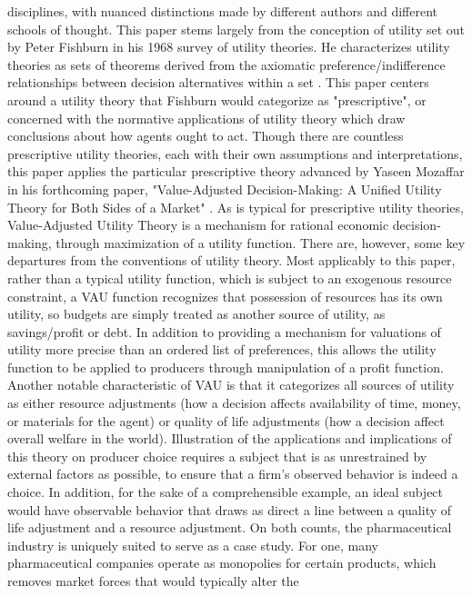 \documentclass[12pt,english]{article} \usepackage{mathptmx}
\begin{document}
disciplines, with nuanced distinctions made by different authors and 
different schools of thought. This paper stems largely from the 
conception of utility set out by Peter Fishburn in his 1968 survey of 
utility theories. He characterizes utility theories as sets of theorems 
derived from the axiomatic preference/indifference relationships between 
decision alternatives within a set \cite{fishburn68}. This paper centers 
around a utility theory that Fishburn would categorize as 
"prescriptive", or concerned with the normative applications of utility 
theory which draw conclusions about how agents ought to act. Though 
there are countless prescriptive utility theories, each with their own 
assumptions and interpretations, this paper applies the particular 
prescriptive theory advanced by Yaseen Mozaffar in his forthcoming 
paper, "Value-Adjusted Decision-Making: A Unified Utility Theory for 
Both Sides of a Market" \cite{mozaffar20}. As is typical for 
prescriptive utility theories, Value-Adjusted Utility Theory is a 
mechanism for rational economic decision-making, through maximization of 
a utility function. There are, however, some key departures from the 
conventions of utility theory. Most applicably to this paper, rather 
than a typical utility function, which is subject to an exogenous 
resource constraint, a VAU function recognizes that possession of 
resources has its own utility, so budgets are simply treated as another 
source of utility, as savings/profit or debt. In addition to providing a 
mechanism for valuations of utility more precise than an ordered list of 
preferences, this allows the utility function to be applied to producers 
through manipulation of a profit function. Another notable 
characteristic of VAU is that it categorizes all sources of utility as 
either resource adjustments (how a decision affects availability of 
time, money, or materials for the agent) or quality of life adjustments 
(how a decision affect overall welfare in the world). Illustration of 
the applications and implications of this theory on producer choice 
requires a subject that is as unrestrained by external factors as 
possible, to ensure that a firm's observed behavior is indeed a choice. 
In addition, for the sake of a comprehensible example, an ideal subject 
would have observable behavior that draws as direct a line between a 
quality of life adjustment and a resource adjustment. On both counts, 
the pharmaceutical industry is uniquely suited to serve as a case study. 
For one, many pharmaceutical companies operate as monopolies for certain 
products, which removes market forces that would typically alter the 
\end{document}
